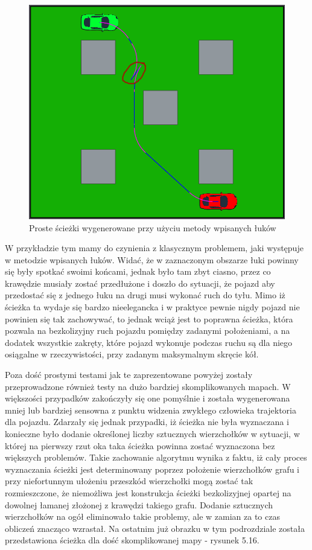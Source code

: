 \documentclass[a4paper,11pt,twoside]{report}
\theoremstyle{definition}
\begin{document}
\begin{figure}[h!]
\centering
\includegraphics[scale=0.6]{simplePath3}
\caption[Proste ścieżki wygenerowane przy użyciu metody wpisanych łuków]{Proste ścieżki wygenerowane przy użyciu metody wpisanych łuków}
\end{figure}

W przykładzie tym mamy do czynienia z klasycznym problemem, jaki występuje w metodzie wpisanych łuków. Widać, że w zaznaczonym obszarze łuki powinny się były spotkać swoimi końcami, jednak było tam zbyt ciasno, przez co krawędzie musiały zostać przedłużone i doszło do sytuacji, że pojazd aby przedostać się z jednego łuku na drugi musi wykonać ruch do tyłu. Mimo iż ścieżka ta wydaje się bardzo nieelegancka i w praktyce pewnie nigdy pojazd nie powinien się tak zachowywać, to jednak wciąż jest to poprawna ścieżka, która pozwala na bezkolizyjny ruch pojazdu pomiędzy zadanymi położeniami, a na dodatek wszystkie zakręty, które pojazd wykonuje podczas ruchu są dla niego osiągalne w rzeczywistości, przy zadanym maksymalnym skręcie kół.

Poza dość prostymi testami jak te zaprezentowane powyżej zostały przeprowadzone również testy na dużo bardziej skomplikowanych mapach. W większości przypadków zakończyły się one pomyślnie i została wygenerowana mniej lub bardziej sensowna z punktu widzenia zwykłego człowieka trajektoria dla pojazdu. Zdarzały się jednak przypadki, iż ścieżka nie była wyznaczana i konieczne było dodanie określonej liczby sztucznych wierzchołków w sytuacji, w której na pierwszy rzut oka taka ścieżka powinna zostać wyznaczona bez większych problemów. Takie zachowanie algorytmu wynika z faktu, iż cały proces wyznaczania ścieżki jest determinowany poprzez położenie wierzchołków grafu i przy niefortunnym ułożeniu przeszkód wierzchołki mogą zostać tak rozmieszczone, że niemożliwa jest konstrukcja ścieżki bezkolizyjnej opartej na dowolnej łamanej złożonej z krawędzi takiego grafu. Dodanie sztucznych wierzchołków na ogół eliminowało takie problemy, ale w zamian za to czas obliczeń znacząco wzrastał. Na ostatnim już obrazku w tym podrozdziale została przedstawiona ścieżka dla dość skomplikowanej mapy - rysunek 5.16.
\end{document}
